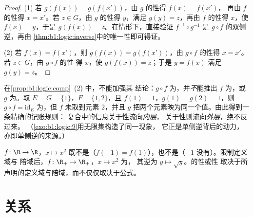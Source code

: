 \begin{proof}
(1) 若 $g(f(x)) = g(f(x'))$，由 $g$ 的性得 $f(x) = f(x')$，
再由 $f$ 的性得 $x = x'$。若 $z \in G$，由
$g$ 的性得 $y$，满足 $g(y) = z$，再由 $f$ 的性得 $x$，使
$f(x) = y$，于是 $g(f(x)) = z$。在情形下，直接验证
$f^{-1} \circ g^{-1}$ 是 $g \circ f$ 的双侧逆，再由
\cref{thm:b1:logic:inverse}中的唯一性即可得证。

(2) 若 $f(x) = f(x')$，则 $g(f(x)) = g(f(x'))$，由
$g \circ f$ 的性得 $x = x'$。若 $z \in G$，由 $g \circ f$ 的性
得 $x$，使 $g(f(x)) = z$；于是 $y = f(x)$ 满足 $g(y) = z$。
\end{proof}

\begin{example}[(2) 不可加强]\label{ex:b1:logic:compsharp}
在\cref{prop:b1:logic:comp}~(2) 中，不能加强其
结论：$g \circ f$ 为，并\emph{不}能推出 $f$
为，或 $g$ 为。取 $E = G = \{1\}$，$F = \{1,
2\}$，且 $f(1) = 1$，$g(1) = g(2) = 1$，则 $g \circ f =
\mathrm{id}_E$ 为，但 $f$ 未取到元素 $2$，并且
$g$ 把两个元素映为同一个值。由此得到一条精确的记账规则：
复合中的信息关于性流向\emph{内层}，
关于性则流向\emph{外层}，绝不反过来。
（\cref{exo:b1:logic:9}用无限集构造了同一现象，
它正是单侧逆背后的动力，
亦即单侧逆的来源。）
\end{example}

\begin{example}\label{ex:b1:logic:injexamples}
$f \colon \R \to \R$，$x \mapsto x^2$ 既不是（$f(-1) =
f(1)$），也不是（$-1$ 没有）。限制定义域与
陪域后，$f \colon \R_+ \to \R_+$，$x \mapsto x^2$ 为，
其逆为 $y \mapsto \sqrt y$。的性或性
取决于所声明的定义域与陪域，而不仅仅取决于公式。
\end{example}

\section{关系}

